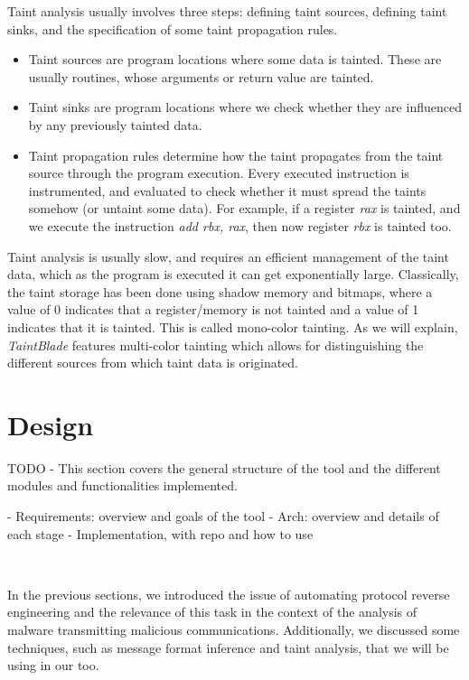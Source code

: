 \documentclass[conference]{IEEEtran}
\begin{document}
Taint analysis usually involves three steps: defining taint sources, defining
taint sinks, and the specification of some taint propagation rules.
\begin{itemize}
    \item Taint sources are program locations where some data is tainted. These are
          usually routines, whose arguments or return value are tainted.
    \item Taint sinks are program locations where we check whether they are influenced by
          any previously tainted data.
    \item Taint propagation rules determine how the taint propagates from the taint
          source through the program execution. Every executed instruction is
          instrumented, and evaluated to check whether it must spread the taints somehow
          (or untaint some data). For example, if a register \textit{rax} is tainted, and
          we execute the instruction \textit{add rbx, rax}, then now register
          \textit{rbx} is tainted too.
\end{itemize}

Taint analysis is usually slow, and requires an efficient management of the
taint data, which as the program is executed it can get exponentially large.
Classically, the taint storage has been done using shadow memory and bitmaps,
where a value of 0 indicates that a register/memory is not tainted and a value
of 1 indicates that it is tainted. This is called mono-color tainting. As we 
will explain, \textit{TaintBlade} features multi-color tainting which allows
for distinguishing the different sources from which taint data is originated.

\section{Design}
TODO - This section covers the general structure of the tool and the different
modules and functionalities implemented.

- Requirements: overview and goals of the tool
- Arch: overview and details of each stage
- Implementation, with repo and how to use

\

In the previous sections, we introduced the issue of automating protocol
reverse engineering and the relevance of this task in the context of the
analysis of malware transmitting malicious communications. Additionally, we
discussed some techniques, such as message format inference and taint analysis,
that we will be using in our too.
\end{document}
